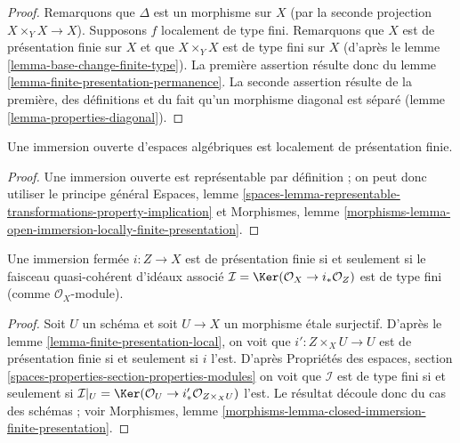 \begin{proof}
Remarquons que $\Delta$ est un morphisme sur $X$ (par la seconde
projection $X \times_Y X \to X$). Supposons $f$ localement de type fini.
Remarquons que $X$ est de présentation finie sur $X$ et que $X \times_Y X$ est
de type fini sur $X$ (d'après le lemme \ref{lemma-base-change-finite-type}).
La première assertion résulte donc du
lemme \ref{lemma-finite-presentation-permanence}.
La seconde assertion résulte de la première, des définitions et
du fait qu'un morphisme diagonal est séparé
(lemme \ref{lemma-properties-diagonal}).
\end{proof}

\begin{lemma}
\label{lemma-open-immersion-locally-finite-presentation}
Une immersion ouverte d'espaces algébriques est localement de présentation finie.
\end{lemma}

\begin{proof}
Une immersion ouverte est représentable par définition ; on peut donc
utiliser le principe général
Espaces,
lemme \ref{spaces-lemma-representable-transformations-property-implication}
et
Morphismes,
lemme \ref{morphisms-lemma-open-immersion-locally-finite-presentation}.
\end{proof}

\begin{lemma}
\label{lemma-closed-immersion-finite-presentation}
Une immersion fermée $i : Z \to X$ est de présentation finie si et seulement si
le faisceau quasi-cohérent d'idéaux associé
$\mathcal{I} = \Ker(\mathcal{O}_X \to i_*\mathcal{O}_Z)$
est de type fini (comme $\mathcal{O}_X$-module).
\end{lemma}

\begin{proof}
Soit $U$ un schéma et soit $U \to X$ un morphisme étale surjectif.
D'après le lemme \ref{lemma-finite-presentation-local},
on voit que $i' : Z \times_X U \to U$ est de présentation finie si et
seulement si $i$ l'est. D'après Propriétés des espaces, section
\ref{spaces-properties-section-properties-modules}
on voit que $\mathcal{I}$ est de type fini si et seulement si
$\mathcal{I}|_U = \Ker(\mathcal{O}_U \to i'_*\mathcal{O}_{Z \times_X U})$
l'est. Le résultat découle donc du cas des schémas ; voir Morphismes,
lemme \ref{morphisms-lemma-closed-immersion-finite-presentation}.
\end{proof}







